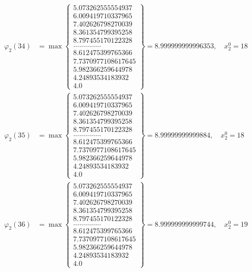 \documentclass{article}
\begin{document}
\begin{align*}
  
  
  
\varphi_{2}(34) &= \max \left\{ \begin{array}{c}
5.073262555554937 \\
 6.009419710337965 \\
 7.402626798270039 \\
 8.361354799395258 \\
 8.797455170122328 \\
 .............. \\
 8.612475399765366 \\
 7.7370977108617645 \\
 5.982366259644978 \\
 4.24893534183932 \\
 4.0
\end{array} \right\} = 8.999999999996353, \quad x_{2}^0 = 18\\
  
  
  
  
\varphi_{2}(35) &= \max \left\{ \begin{array}{c}
5.073262555554937 \\
 6.009419710337965 \\
 7.402626798270039 \\
 8.361354799395258 \\
 8.797455170122328 \\
 .............. \\
 8.612475399765366 \\
 7.7370977108617645 \\
 5.982366259644978 \\
 4.24893534183932 \\
 4.0
\end{array} \right\} = 8.99999999999884, \quad x_{2}^0 = 18\\
  
  
  
  
\varphi_{2}(36) &= \max \left\{ \begin{array}{c}
5.073262555554937 \\
 6.009419710337965 \\
 7.402626798270039 \\
 8.361354799395258 \\
 8.797455170122328 \\
 .............. \\
 8.612475399765366 \\
 7.7370977108617645 \\
 5.982366259644978 \\
 4.24893534183932 \\
 4.0
\end{array} \right\} = 8.999999999999744, \quad x_{2}^0 = 19\\
  
  
\end{align*}
\end{document}
